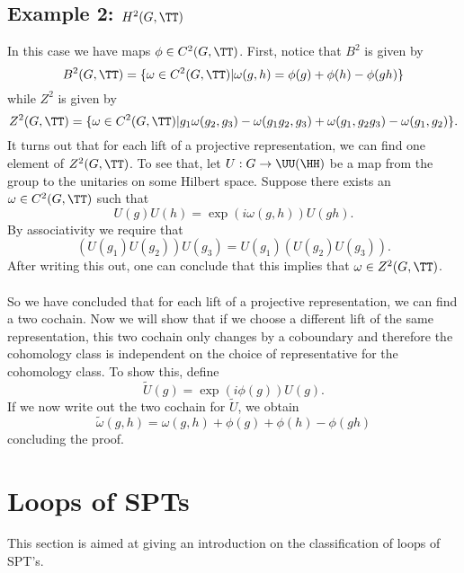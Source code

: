 \subsection{Example 2: $H^2(G,\TT)$}\label{sec:example-2-h2gtt}
In this case we have maps $\phi\in C^2(G,\TT)$. First, notice that $B^2$ is given by
\begin{equation}
B^2(G,\TT)=\{\omega\in C^2(G,\TT)|\omega(g,h)=\phi(g)+\phi(h)-\phi(gh)\}
\end{equation}
while $Z^2$ is given by
\begin{equation}
Z^2(G,\TT)=\{\omega\in C^2(G,\TT)|g_1\omega(g_2,g_3)-\omega(g_1g_2,g_3)+\omega(g_1,g_2g_3)-\omega(g_1,g_2)\}. 
\end{equation}
It turns out that for each lift of a projective representation, we can find one element of $Z^2(G,\TT)$. To see that, let $U:G\rightarrow\UU(\HH)$ be a map from the group to the unitaries on some Hilbert space. Suppose there exists an $\omega\in C^2(G,\TT)$ such that
\begin{equation}
U(g)U(h)=\exp(i\omega(g,h))U(gh).
\end{equation}
By associativity we require that
\begin{equation}
(U(g_1)U(g_2))U(g_3)=U(g_1)(U(g_2)U(g_3)).
\end{equation}
After writing this out, one can conclude that this implies that $\omega\in Z^2(G,\TT)$.\\\\
So we have concluded that for each lift of a projective representation, we can find a two cochain. Now we will show that if we choose a different lift of the same representation, this two cochain only changes by a coboundary and therefore the cohomology class is independent on the choice of representative for the cohomology class. To show this, define
\begin{equation}
\tilde{U}(g)=\exp(i \phi(g))U(g).
\end{equation}
If we now write out the two cochain for $\tilde{U}$, we obtain
\begin{equation}
\tilde{\omega}(g,h)=\omega(g,h)+\phi(g)+\phi(h)-\phi(gh)
\end{equation}
concluding the proof.
\section{Loops of SPTs}\label{sec:loops-of-spts}
This section is aimed at giving an introduction on the classification of loops of SPT's.
